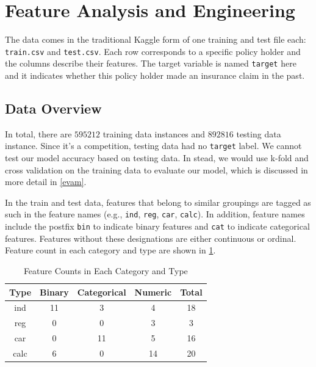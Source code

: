 \documentclass{standalone}
\begin{document}
\section{Feature Analysis and Engineering}

The data comes in the traditional Kaggle form of one training and test file
each: \lstinline{train.csv} and \lstinline{test.csv}. Each row corresponds to a
specific policy holder and the columns describe their features. The target
variable is named \lstinline{target} here and it indicates whether this policy
holder made an insurance claim in the past.

\subsection{Data Overview}

In total, there are $595212$ training data instances and $892816$ testing data instance. Since it's a competition, testing data had no \lstinline{target} label. We cannot test our model accuracy based on testing data. In stead, we would use k-fold and cross validation on the training data to evaluate our model, which is discussed in more detail in \cref{evam}.

In the train and test data, features that belong to similar groupings are
tagged as such in the feature names (e.g., \lstinline{ind}, \lstinline{reg},
\lstinline{car}, \lstinline{calc}). In addition, feature names include the
postfix \lstinline{bin} to indicate binary features and \lstinline{cat} to
indicate categorical features. Features without these designations are either
continuous or ordinal. Feature count in each category and type are shown in \cref{feature_count}.

\begin{table}[!h]
\renewcommand{\arraystretch}{1.3}
\caption{Feature Counts in Each Category and Type}\label{feature_count}
\centering
\begin{tabular}{c|cccc}
\hline
\bfseries Type & \bfseries  Binary & \bfseries  Categorical & \bfseries  Numeric & \bfseries Total \\ \hline
\ttfamily ind & 11 & 3 & 4 & 18 \\ \hline
\ttfamily reg & 0 & 0 & 3 & 3 \\ \hline
\ttfamily car & 0 & 11 & 5 & 16 \\ \hline
\ttfamily calc & 6 & 0 & 14 & 20 \\ \hline
\end{tabular}

\end{table}
\end{document}
